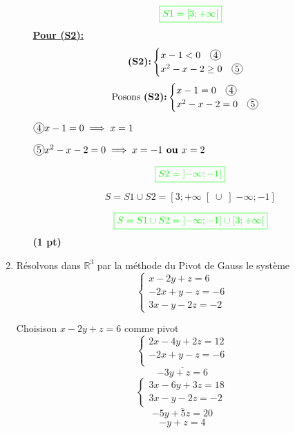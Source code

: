 \documentclass[12pt,a4paper]{article}
\begin{document}
\begin{enumerate}
\begin{enumerate}
\begin{flushleft}
\end{flushleft}
\[
\textcolor{green}{\boxed{S1 = \left[3 ; +\infty\right[  }} 
\]
\underline{\textbf{Pour (S2):}}
\[
\textbf{(S2):}\begin{cases}
x - 1 < 0 \quad \encercle{4} \\
x^2 - x - 2 \geq 0 \quad \encercle{5}
\end{cases}
\]
\[\text{Posons }\textbf{(S2):}
\begin{cases}
x - 1 = 0 \quad \encercle{4} \\
x^2 - x - 2 = 0 \quad \encercle{5}
\end{cases}
\]

\( \encercle{4} x - 1 = 0 \implies x=1\)

\( \encercle{5} x^2 - x - 2 = 0 \implies x=-1 \textbf{ ou } x= 2\)
\begin{flushleft}
\end{flushleft}
\[
\textcolor{green}{\boxed{S2 = \left]-\infty ; -1\right]  }} 
\]

\[ S=S1 \cup S2 =\left[3 ; +\infty\right[ \cup \left]-\infty ; -1\right] \]


\[
\textcolor{green}{\boxed{S=S1 \cup S2 = \left]-\infty ; -1\right]  \cup \left[3 ; +\infty\right[ }} 
\] \hfill \textbf{(1 pt)}
\end{enumerate}
    \item Résolvons dans $\mathbb{R}^3$ par la méthode du Pivot de Gauss le système
    \[
    \begin{cases}
        x - 2y + z = 6 \\
        -2x + y - z = -6 \\
        3x - y - 2z = -2
    \end{cases}
    \]

Choisison $x - 2y + z = 6$ comme pivot 
    \[
\underline{    \begin{cases}
        2x - 4y + 2z = 12 \\
        -2x + y - z = -6 \\
    \end{cases}}
    \]
    \[-3y+z=6\]
    \[
\underline{    \begin{cases}
        3x - 6y + 3z = 18 \\
        3x - y - 2z = -2 
    \end{cases}}
    \]
    \[-5y+5z=20\]
    \[-y+z=4\]


\end{enumerate}
\end{document}
